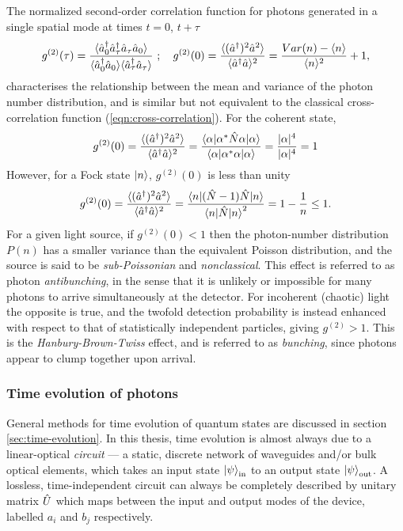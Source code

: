 The normalized second-order correlation function for photons generated in a single spatial mode at times $t=0$, $t+\tau$
\begin{equation}
g^{(2)}(\tau)=\frac
{
    \langle  \hat{a}^{\dagger}_0 \hat{a}^{\dagger}_\tau \hat{a}_\tau \hat{a}_0  \rangle
}{
    \langle  \hat{a}^{\dagger}_0 \hat{a}_0 \rangle \langle  \hat{a}^{\dagger}_\tau \hat{a}_\tau  \rangle
}~;\quad
g^{(2)}(0)=\frac {
    \langle  (\hat{a}^{\dagger})^2  \hat{a}^2 \rangle }{
    \langle  \hat{a}^{\dagger} \hat{a}  \rangle^2 } 
=
\frac {Var(n) - \langle n \rangle} {\langle n \rangle^2} + 1
,
\end{equation}
characterises the relationship between the mean and variance of the photon number distribution, and 
is similar but not equivalent to the classical cross-correlation function (\ref{eqn:cross-correlation}). 
For the coherent state,
\begin{equation}
    g^{(2)}(0)=\frac { \langle  (\hat{a}^{\dagger})^2  \hat{a}^2 \rangle
    }{ \langle  \hat{a}^{\dagger} \hat{a}  \rangle^2 } 
    =
    \frac{\mbox{$ \langle \alpha | $} \alpha^* \hat{N} \alpha \mbox{$ | \alpha \rangle $}}
    {\mbox{$ \langle \alpha | $}\alpha^* \alpha\mbox{$ | \alpha \rangle $}} = \frac{|\alpha|^4}{|\alpha|^4} = 1
    \label{eqn:coherent-state-g2}
\end{equation}
However, for a Fock state $\mbox{$ | n \rangle $}$, $g^{(2)}(0)$ is less than unity
\begin{equation}
    g^{(2)}(0)=\frac { \langle  (\hat{a}^{\dagger})^2  \hat{a}^2 \rangle
    }{ \langle  \hat{a}^{\dagger} \hat{a}  \rangle^2 } 
    =
    \frac{\mbox{$ \langle n | $}(\hat{N}-1)\hat{N} \mbox{$ | n \rangle $}}
    {\mbox{$ \langle n | $}\hat{N}\mbox{$ | n \rangle $}^2}
    = 1-\frac{1}{n}  \le 1.
    \label{eqn:antibunching}
\end{equation}
For a given light source, if $g^{(2)}(0)<1$ then the photon-number distribution $P(n)$ has a smaller variance than the equivalent Poisson distribution, and the source is said to be \emph{sub-Poissonian} and \emph{nonclassical}. This effect is referred to as photon \emph{antibunching}, in the sense that it is unlikely or impossible for many photons to arrive simultaneously at the detector.  For incoherent (chaotic) light the opposite is true, and the twofold detection probability is instead enhanced with respect to that of statistically independent particles, giving $g^{(2)}>1$. This is the \emph{Hanbury-Brown-Twiss} \cite{Brown1956b} effect, and is referred to as \emph{bunching}, since photons appear to clump together upon arrival.

\subsubsection{Time evolution of photons}
General methods for time evolution of quantum states are discussed in section \ref{sec:time-evolution}.
In this thesis, time evolution is almost always due to a linear-optical \emph{circuit} --- a static, discrete network of waveguides and/or bulk optical elements, which takes an input state $\mbox{$ | \psi \rangle $}_{\mathrm{in}}$ to an output state $\mbox{$ | \psi \rangle $}_{\mathrm{out}}$.  A lossless, time-independent circuit can always be completely described by  unitary matrix $\hat{U}$ which maps between the input and output modes of the device, labelled $a_i$ and $b_j$ respectively. 

